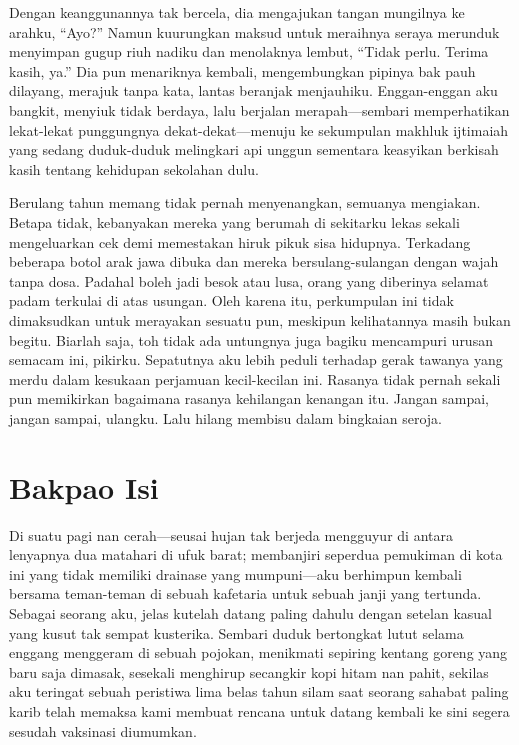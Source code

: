\documentclass[smalldemyvopaper,11pt,twoside,onecolumn,openright,extrafontsizes]{memoir}
\begin{document}

Dengan keanggunannya tak bercela, dia mengajukan tangan mungilnya ke arahku, ``Ayo?'' Namun kuurungkan maksud untuk meraihnya seraya merunduk menyimpan gugup riuh nadiku dan menolaknya lembut, ``Tidak perlu. Terima kasih, ya.'' Dia pun menariknya kembali, mengembungkan pipinya bak pauh dilayang, merajuk tanpa kata, lantas beranjak menjauhiku. Enggan-enggan aku bangkit, menyiuk tidak berdaya, lalu berjalan merapah---sembari memperhatikan lekat-lekat punggungnya dekat-dekat---menuju ke sekumpulan makhluk ijtimaiah yang sedang duduk-duduk melingkari api unggun sementara keasyikan berkisah kasih tentang kehidupan sekolahan dulu.

Berulang tahun memang tidak pernah menyenangkan, semuanya mengiakan. Betapa tidak, kebanyakan mereka yang berumah di sekitarku lekas sekali mengeluarkan cek demi memestakan hiruk pikuk sisa hidupnya. Terkadang beberapa botol arak jawa dibuka dan mereka bersulang-sulangan dengan wajah tanpa dosa. Padahal boleh jadi besok atau lusa, orang yang diberinya selamat padam terkulai di atas usungan. Oleh karena itu, perkumpulan ini tidak dimaksudkan untuk merayakan sesuatu pun, meskipun kelihatannya masih bukan begitu. Biarlah saja, toh tidak ada untungnya juga bagiku mencampuri urusan semacam ini, pikirku. Sepatutnya aku lebih peduli terhadap gerak tawanya yang merdu dalam kesukaan perjamuan kecil-kecilan ini. Rasanya tidak pernah sekali pun memikirkan bagaimana rasanya kehilangan kenangan itu. Jangan sampai, jangan sampai, ulangku. Lalu hilang membisu dalam bingkaian seroja.

\chapter{Bakpao Isi}


Di suatu pagi nan cerah---seusai hujan tak berjeda mengguyur di antara lenyapnya dua matahari di ufuk barat; membanjiri seperdua pemukiman di kota ini yang tidak memiliki drainase yang mumpuni---aku berhimpun kembali bersama teman-teman di sebuah kafetaria untuk sebuah janji yang tertunda. Sebagai seorang aku, jelas kutelah datang paling dahulu dengan setelan kasual yang kusut tak sempat kusterika. Sembari duduk bertongkat lutut selama enggang menggeram di sebuah pojokan, menikmati sepiring kentang goreng yang baru saja dimasak, sesekali menghirup secangkir kopi hitam nan pahit, sekilas aku teringat sebuah peristiwa lima belas tahun silam saat seorang sahabat paling karib telah memaksa kami membuat rencana untuk datang kembali ke sini segera sesudah vaksinasi diumumkan.
\end{document}
